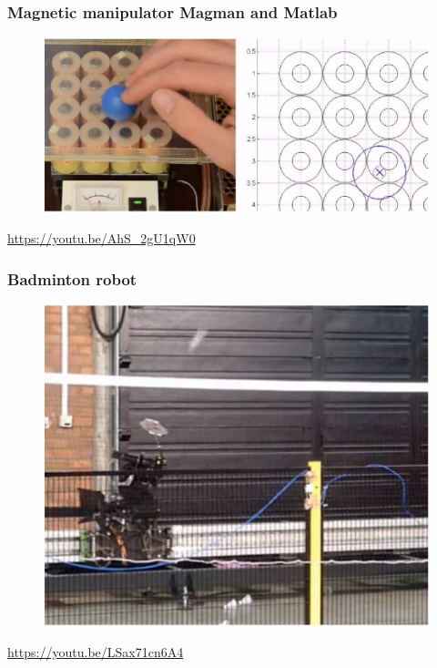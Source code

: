 \documentclass{beamer}
\begin{document}

\begin{frame}
\frametitle{Magnetic manipulator Magman and Matlab}
\begin{figure}
\includegraphics[scale=.7]{magnetic_manipulator}
\end{figure}
\url{https://youtu.be/AhS_2gU1qW0}
\end{frame}


\begin{frame}
\frametitle{Badminton robot}
\begin{figure}
\includegraphics[scale=.5]{badminton_robot}
\end{figure}
\url{https://youtu.be/LSax71cn6A4}
\end{frame}

\end{document}
